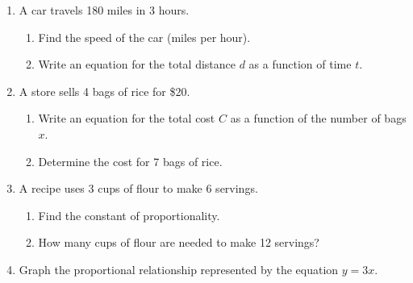 \documentclass[12pt]{article}
\begin{document}
\vspace{1em}

\begin{tcolorbox}[colframe=black!60, colback=white, 
coltitle=black, colbacktitle=black!15, fonttitle=\bfseries\Large, 
title=Problems, halign title=center, left=10pt, right=10pt, top=10pt, bottom=30pt]
\begin{enumerate}[start=9, itemsep=3em]
    \item A car travels 180 miles in 3 hours. 
    \begin{enumerate}[label=(\alph*)]
        \item Find the speed of the car (miles per hour).  
        \item Write an equation for the total distance \(d\) as a function of time \(t\).  
    \end{enumerate}
    \item A store sells 4 bags of rice for \$20.  
    \begin{enumerate}[label=(\alph*)]
        \item Write an equation for the total cost \(C\) as a function of the number of bags \(x\).  
        \item Determine the cost for 7 bags of rice.  
    \end{enumerate}
    \item A recipe uses 3 cups of flour to make 6 servings.  
    \begin{enumerate}[label=(\alph*)]
        \item Find the constant of proportionality.  
        \item How many cups of flour are needed to make 12 servings?  
    \end{enumerate}
        \item Graph the proportional relationship represented by the equation \(y = 3x\).
         
    \begin{center}
\end{center}
\end{enumerate}
\end{tcolorbox}
\end{document}

